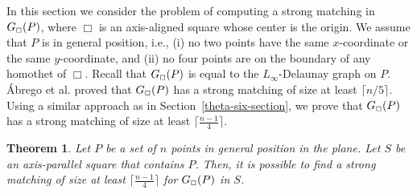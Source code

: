 \documentclass[11pt,a4paper]{article}
\newcommand{\G}[2]{G_{#1}({#2})}
\newcommand{\sqr}{\Box}
\newcommand{\sqrs}{\scriptsize\Box}
\newtheorem{theorem}{Theorem}
\begin{document}
In this section we consider the problem of computing a strong matching in $\G{\sqrs}{P}$, where $\sqr$ is an axis-aligned square whose center is the origin. We assume that $P$ is in general position, i.e., (i) no two points have the same $x$-coordinate or the same $y$-coordinate, and (ii) no four points are on the boundary of any homothet of $\sqr$. Recall that $\G{\sqrs}{P}$ is equal to the $L_\infty$-Delaunay graph on $P$. \'{A}brego et al. \cite{Abrego2004, Abrego2009} proved that $\G{\sqrs}{P}$ has a strong matching of size at least $\lceil n/5\rceil$. Using a similar approach as in Section~\ref{theta-six-section}, we prove that $\G{\sqrs}{P}$ has a strong  matching of size at least $\lceil\frac{n-1}{4}\rceil$.

\label{infty-Delaunay-section}
\begin{theorem}
\label{infty-Delaunay-thr}
Let $P$ be a set of $n$ points in general position in the plane. Let $S$ be an axis-parallel square that contains $P$. Then, it is possible to find a strong matching of size at least $\lceil\frac{n-1}{4}\rceil$ for $\G{\sqrs}{P}$ in $S$.
\end{theorem}
\end{document}
